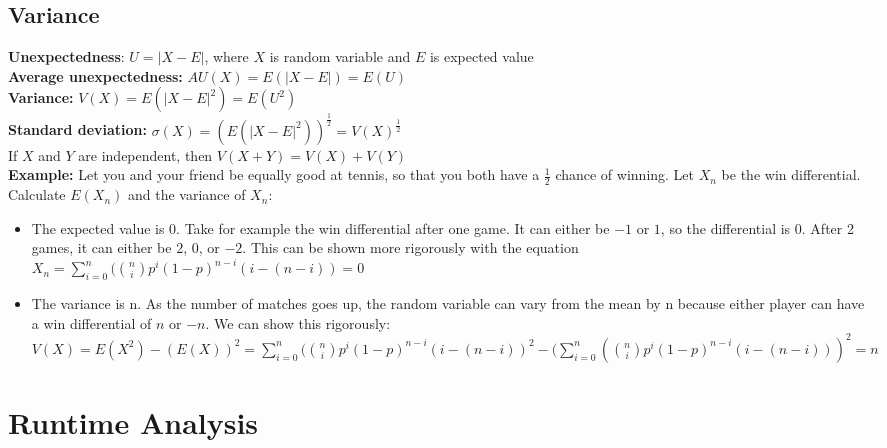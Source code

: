 \documentclass{article}
\begin{document}
\begin{spacing}{1.5}
\subsection{Variance}
\label{sec:variance}
\textbf{Unexpectedness}:
$U=|X-E|$, where $X$ is random variable and $E$ is expected value\\
\textbf{Average unexpectedness:}
$AU(X) = E(|X-E|)=E(U)$\\
\textbf{Variance:}
$V(X)=E(|X-E|^2)=E(U^2)$\\
\textbf{Standard deviation:}
$\sigma(X)=(E(|X-E|^2))^{\frac{1}{2}}=V(X)^{\frac{1}{2}}$\\
If $X$ and $Y$ are independent, then $V(X+Y)=V(X)+V(Y)$\\
\textbf{Example:} Let you and your friend be equally good at tennis, so that you both have a $\frac{1}{2}$ chance of winning. Let $X_n$ be the win differential. Calculate $E(X_n)$ and the variance of $X_n$:\\
\begin{itemize}
    \item The expected value is 0. Take for example the win differential after one game. It can either be $-1$ or $1$, so the differential is 0. After 2 games, it can either be $2$, $0$, or $-2$. This can be shown more rigorously with the equation $X_n = \sum_{i=0}^n(\binom{n}{i}p^i(1-p)^{n-i}(i-(n-i)) = 0$\\
    \item The variance is n. As the number of matches goes up, the random variable can vary from the mean by n because either player can have a win differential of $n$ or $-n$. We can show this rigorously:
    $V(X) =
    E(X^2)-(E(X))^2=
    \sum_{i=0}^n(\binom{n}{i}p^i(1-p)^{n-i}(i-(n-i))^2 - (\sum_{i=0}^n(\binom{n}{i}p^i(1-p)^{n-i}(i-(n-i)))^2=n$
\end{itemize}

\section{Runtime Analysis}
\label{sec:runtime}

\end{spacing}
\end{document}

